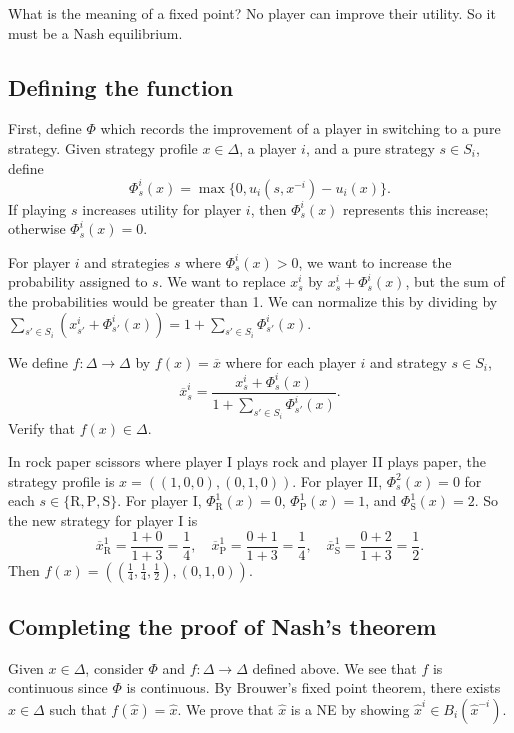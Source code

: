 \documentclass[12pt,letterpaper]{report}
\begin{document}
What is the meaning of a fixed point?
No player can improve their utility.
So it must be a Nash equilibrium.

\subsection{Defining the function}

First, define $\Phi$ which records the improvement of a player in switching to a pure strategy.
Given strategy profile $x \in \Delta$, a player $i$, and a pure strategy $s \in S_i$, define
\[
  \Phi_s^i(x) = \max \{ 0, u_i(s, x^{-i}) - u_i(x) \}.
\]
If playing $s$ increases utility for player $i$, then $\Phi_s^i(x)$ represents this increase;
otherwise $\Phi_s^i(x) = 0$.

For player $i$ and strategies $s$ where $\Phi_s^i(x) > 0$, we want to increase the probability
assigned to $s$.
We want to replace $x_s^i$ by $x_s^i + \Phi_s^i(x)$, but the sum of the probabilities would be
greater than 1.
We can normalize this by dividing by $\sum\limits_{s' \in S_i} (x_{s'}^i + \Phi_{s'}^i(x)) =
  1 + \sum\limits_{s' \in S_i} \Phi_{s'}^i(x)$.

We define $f \colon \Delta \to \Delta$ by $f(x) = \overline{x}$ where for each player $i$ and
strategy $s \in S_i$,
\[
  \overline{x}_s^i = \frac{x_s^i + \Phi_s^i(x)}{1 + \sum\limits_{s' \in S_i} \Phi_{s'}^i(x)}.
\]
Verify that $f(x) \in \Delta$.

\begin{ex}
  In rock paper scissors where player I plays rock and player II plays paper, the strategy profile
  is $x = ((1, 0, 0), (0, 1, 0))$.
  For player II, $\Phi_s^2(x) = 0$ for each $s \in \{ \text{R}, \text{P}, \text{S} \}$.
  For player I, $\Phi_\text{R}^1(x) = 0$, $\Phi_\text{P}^1(x) = 1$, and $\Phi_\text{S}^1(x) = 2$.
  So the new strategy for player I is
  \[
    \overline{x}_\text{R}^1 = \frac{1 + 0}{1 + 3} = \frac{1}{4}, \quad
    \overline{x}_\text{P}^1 = \frac{0 + 1}{1 + 3} = \frac{1}{4}, \quad
    \overline{x}_\text{S}^1 = \frac{0 + 2}{1 + 3} = \frac{1}{2}.
  \]
  Then $f(x) = ((\frac{1}{4}, \frac{1}{4}, \frac{1}{2}), (0, 1, 0))$.
\end{ex}

\subsection{Completing the proof of Nash's theorem}

Given $x \in \Delta$, consider $\Phi$ and $f \colon \Delta \to \Delta$ defined above.
We see that $f$ is continuous since $\Phi$ is continuous.
By Brouwer's fixed point theorem, there exists $\hat{x} \in \Delta$ such that
$f(\hat{x}) = \hat{x}$.
We prove that $\hat{x}$ is a NE by showing $\hat{x}^i \in B_i(\hat{x}^{-i})$.
\end{document}
